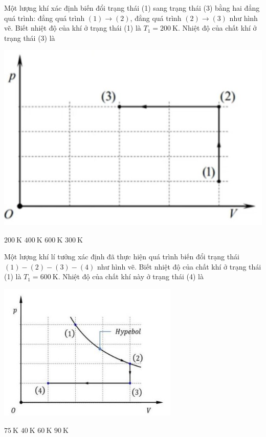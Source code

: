 \begin{ex}
	Một lượng khí xác định biến đổi trạng thái (1) sang trạng thái (3) bằng hai đẳng quá trình: đẳng quá trình $(1)\rightarrow(2)$, đẳng quá trình $(2)\rightarrow(3)$ như hình vẽ. Biết nhiệt độ của khí ở trạng thái (1) là $T_1=\SI{200}{\kelvin}$. Nhiệt độ của chất khí ở trạng thái (3) là
	\begin{center}
		\includegraphics[width=0.3\linewidth]{figs/VN12-Y24-PH-SYL-014P-1}
	\end{center}
	\choice
	{$\SI{200}{\kelvin}$}
	{\True $\SI{400}{\kelvin}$}
	{$\SI{600}{\kelvin}$}
	{$\SI{300}{\kelvin}$}
\end{ex}
\begin{ex}
Một lượng khí lí tưởng xác định đã thực hiện quá trình biến đổi trạng thái $(1)-(2)-(3)-(4)$ như hình vẽ. Biết nhiệt độ của chất khí ở trạng thái (1) là $T_1=\SI{600}{\kelvin}$. Nhiệt độ của chất khí này ở trạng thái (4) là
\begin{center}
	\includegraphics[width=0.35\linewidth]{figs/VN12-Y24-PH-SYL-014P-3}
\end{center}
	\choice
	{\True $\SI{75}{\kelvin}$}
	{$\SI{40}{\kelvin}$}
	{$\SI{60}{\kelvin}$}
	{$\SI{90}{\kelvin}$}
\end{ex}
